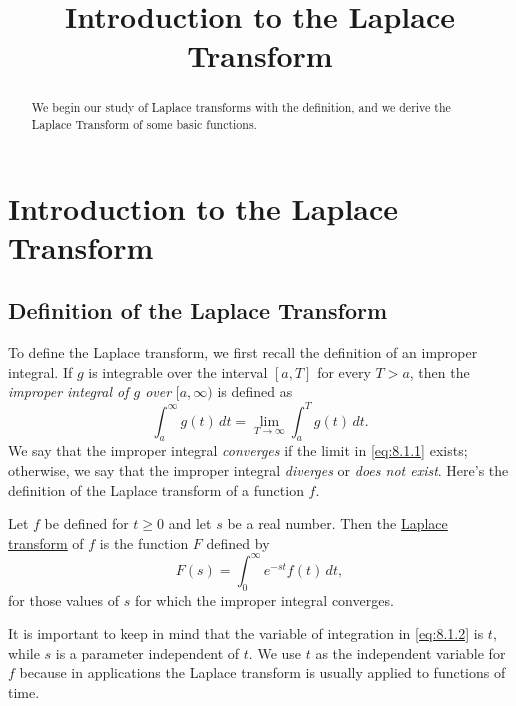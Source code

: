 \documentclass{ximera}
\title{Introduction to the Laplace Transform}%
\begin{document}
\begin{abstract}
We begin our study of Laplace transforms with the definition, and we derive the Laplace Transform of some basic functions.
\end{abstract}

\maketitle

\section*{Introduction to the Laplace Transform}

\subsection*{Definition of the Laplace Transform}

 
To define the Laplace transform, we first recall the definition of an
improper integral. If $g$ is integrable over the
interval $[a,T]$ for every $T>a$, then the \textit{improper
integral of
$g$ over} $[a,\infty)$ is defined as
\begin{equation} \label{eq:8.1.1}
\int^\infty_a g(t)\,dt=\lim_{T\rightarrow\infty}\int^T_a g(t)\,dt.
\end{equation}
We say that the improper integral \textit{converges} if the limit in
\eqref{eq:8.1.1} exists;   otherwise, we say that the improper integral
\textit{diverges} or \textit{does not exist}. Here's the definition of
the Laplace transform of a function $f$.

\begin{definition}\label{thmtype:8.1.1}
Let $f$ be defined for $t\geq 0$ and let $s$ be a real number. Then the
\href{http://www-history.mcs.st-and.ac.uk/Mathematicians/Laplace.html}{Laplace transform} of $f$ is the function $F$ defined by
\begin{equation}\label{eq:8.1.2} F(s)=\int_0^\infty e^{-st} f(t)\,dt,
\end{equation} for those values of $s$ for which the improper integral
converges.
\end{definition}

It is important to keep in mind that the variable of integration in
\eqref{eq:8.1.2} is $t$, while $s$ is a parameter independent of $t$. We
use $t$ as the independent variable for $f$ because in applications
the Laplace transform is usually applied to functions of time.
\end{document}
